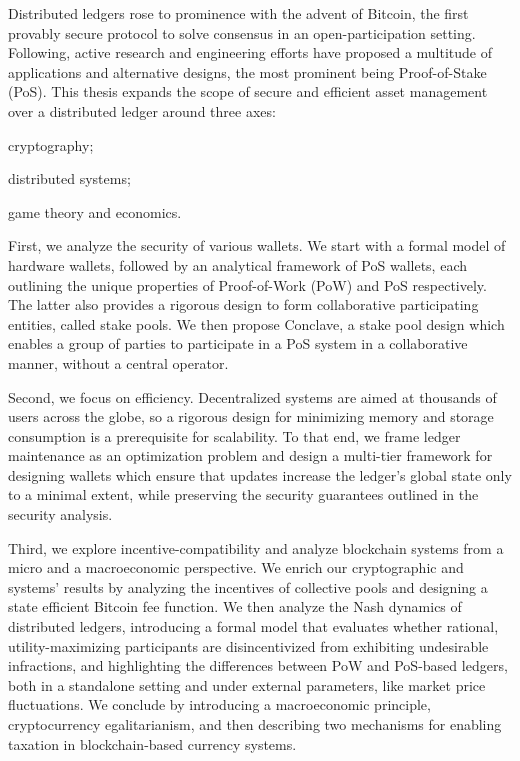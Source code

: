 \begin{floating-abstract}
    Distributed ledgers rose to prominence with the advent of Bitcoin, the
    first provably secure protocol to solve consensus in an
    open-participation setting. Following, active research and engineering
    efforts have proposed a multitude of applications and alternative designs,
    the most prominent being Proof-of-Stake (PoS). This thesis expands the
    scope of secure and efficient asset management over a distributed ledger
    around three axes:
    \begin{inparaenum}[i)]
        \item cryptography;
        \item distributed systems;
        \item game theory and economics.
    \end{inparaenum}

    First, we analyze the security of various wallets. We start with a
    formal model of hardware wallets, followed by an analytical
    framework of PoS wallets, each outlining the unique properties of
    Proof-of-Work (PoW) and PoS respectively. The latter also provides a
    rigorous design to form collaborative participating entities, called
    stake pools. We then propose Conclave, a stake pool design which enables a
    group of parties to participate in a PoS system in a collaborative manner,
    without a central operator.

    Second, we focus on efficiency. Decentralized systems are aimed at
    thousands of users across the globe, so a rigorous design for minimizing
    memory and storage consumption is a prerequisite for scalability.
    To that end, we frame ledger maintenance as an optimization problem and
    design a multi-tier framework for designing wallets which ensure that
    updates increase the ledger's global state only to a minimal extent, while
    preserving the security guarantees outlined in the security analysis.

    Third, we explore incentive-compatibility and analyze blockchain systems
    from a micro and a macroeconomic perspective. We enrich our cryptographic
    and systems' results by analyzing the incentives of collective pools and
    designing a state efficient Bitcoin fee function. We then analyze the Nash
    dynamics of distributed ledgers, introducing a formal model that evaluates
    whether rational, utility-maximizing participants are disincentivized from
    exhibiting undesirable infractions, and highlighting the differences
    between PoW and PoS-based ledgers, both in a standalone setting and under
    external parameters, like market price fluctuations. We conclude by introducing a
    macroeconomic principle, cryptocurrency egalitarianism, and then describing
    two mechanisms for enabling taxation in blockchain-based currency systems.
\end{floating-abstract}
